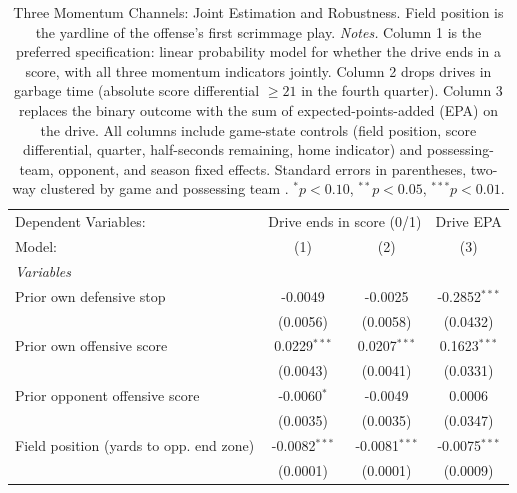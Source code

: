 
\begin{table}[htbp]
   \caption{\label{tab:allchan} Three Momentum Channels: Joint Estimation and Robustness. Field position is the yardline of the offense's first scrimmage play. \textit{Notes.} Column 1 is the preferred specification: linear probability model for whether the drive ends in a score, with all three momentum indicators jointly. Column 2 drops drives in garbage time (absolute score differential $\geq 21$ in the fourth quarter). Column 3 replaces the binary outcome with the sum of expected-points-added (EPA) on the drive. All columns include game-state controls (field position, score differential, quarter, half-seconds remaining, home indicator) and possessing-team, opponent, and season fixed effects. Standard errors in parentheses, two-way clustered by game and possessing team \citep{cameron2011robust}. $^{*}p<0.10$, $^{**}p<0.05$, $^{***}p<0.01$.}
   \centering
   \begin{tabular}{lccc}
      \tabularnewline \midrule \midrule
      Dependent Variables: & \multicolumn{2}{c}{Drive ends in score (0/1)} & Drive EPA\\
      Model:                                  & (1)                           & (2)                           & (3)\\  
      \midrule
      \emph{Variables}\\
      Prior own defensive stop                & -0.0049                       & -0.0025                       & -0.2852$^{***}$\\   
                                              & (0.0056)                      & (0.0058)                      & (0.0432)\\   
      Prior own offensive score               & 0.0229$^{***}$                & 0.0207$^{***}$                & 0.1623$^{***}$\\   
                                              & (0.0043)                      & (0.0041)                      & (0.0331)\\   
      Prior opponent offensive score          & -0.0060$^{*}$                 & -0.0049                       & 0.0006\\   
                                              & (0.0035)                      & (0.0035)                      & (0.0347)\\   
      Field position (yards to opp. end zone) & -0.0082$^{***}$               & -0.0081$^{***}$               & -0.0075$^{***}$\\   
                                              & (0.0001)                      & (0.0001)                      & (0.0009)\\   

\end{tabular}
\end{table}
